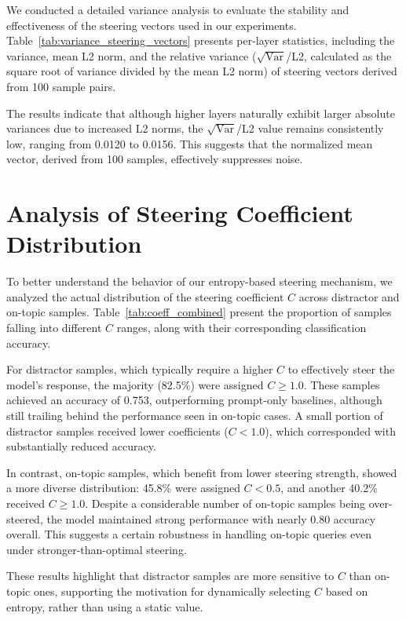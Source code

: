 \documentclass[11pt]{article}
\begin{document}
We conducted a detailed variance analysis to evaluate the stability and effectiveness of the steering vectors used in our experiments. Table~\ref{tab:variance_steering_vectors} presents per-layer statistics, including the variance, mean L2 norm, and the relative variance ($\sqrt{\text{Var}}$/L2, calculated as the square root of variance divided by the mean L2 norm) of steering vectors derived from 100 sample pairs.

The results indicate that although higher layers naturally exhibit larger absolute variances due to increased L2 norms, the $\sqrt{\text{Var}}$/L2 value remains consistently low, ranging from 0.0120 to 0.0156. This suggests that the normalized mean vector, derived from 100 samples, effectively suppresses noise.

\section{Analysis of Steering Coefficient Distribution}
\label{sec:coefficient_analysis}

To better understand the behavior of our entropy-based steering mechanism, we analyzed the actual distribution of the steering coefficient $C$ across distractor and on-topic samples. Table~\ref{tab:coeff_combined} present the proportion of samples falling into different $C$ ranges, along with their corresponding classification accuracy.

For distractor samples, which typically require a higher $C$ to effectively steer the model's response, the majority (82.5\%) were assigned $C \geq 1.0$. These samples achieved an accuracy of 0.753, outperforming prompt-only baselines, although still trailing behind the performance seen in on-topic cases. A small portion of distractor samples received lower coefficients ($C < 1.0$), which corresponded with substantially reduced accuracy.

In contrast, on-topic samples, which benefit from lower steering strength, showed a more diverse distribution: 45.8\% were assigned $C < 0.5$, and another 40.2\% received $C \geq 1.0$. Despite a considerable number of on-topic samples being over-steered, the model maintained strong performance with nearly 0.80 accuracy overall. This suggests a certain robustness in handling on-topic queries even under stronger-than-optimal steering.

These results highlight that distractor samples are more sensitive to $C$ than on-topic ones, supporting the motivation for dynamically selecting $C$ based on entropy, rather than using a static value.
\end{document}
